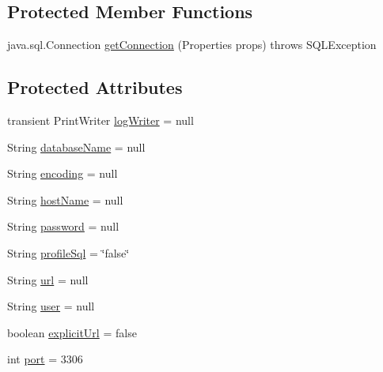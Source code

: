 \subsection*{Protected Member Functions}
\begin{DoxyCompactItemize}
\item 
java.\+sql.\+Connection \mbox{\hyperlink{classcom_1_1mysql_1_1jdbc_1_1jdbc2_1_1optional_1_1_mysql_data_source_ad532c3e1663ec177fe6863bd0c8ca47d}{get\+Connection}} (Properties props)  throws S\+Q\+L\+Exception 
\end{DoxyCompactItemize}
\subsection*{Protected Attributes}
\begin{DoxyCompactItemize}
\item 
transient Print\+Writer \mbox{\hyperlink{classcom_1_1mysql_1_1jdbc_1_1jdbc2_1_1optional_1_1_mysql_data_source_a3395cf528472ec6bca3215ec6cf2f22e}{log\+Writer}} = null
\item 
String \mbox{\hyperlink{classcom_1_1mysql_1_1jdbc_1_1jdbc2_1_1optional_1_1_mysql_data_source_a9a4fed49fe5c75451a4e8a27556c703e}{database\+Name}} = null
\item 
String \mbox{\hyperlink{classcom_1_1mysql_1_1jdbc_1_1jdbc2_1_1optional_1_1_mysql_data_source_aa2b99a9bf60588635622eaa4662203c3}{encoding}} = null
\item 
String \mbox{\hyperlink{classcom_1_1mysql_1_1jdbc_1_1jdbc2_1_1optional_1_1_mysql_data_source_a10b314c7da59aa29686f56db5c720f7c}{host\+Name}} = null
\item 
String \mbox{\hyperlink{classcom_1_1mysql_1_1jdbc_1_1jdbc2_1_1optional_1_1_mysql_data_source_a724ca2e1339665ad95c4044ea387ce2e}{password}} = null
\item 
String \mbox{\hyperlink{classcom_1_1mysql_1_1jdbc_1_1jdbc2_1_1optional_1_1_mysql_data_source_ab8e54fa8599ab0053066000a93b20ac9}{profile\+Sql}} = \char`\"{}false\char`\"{}
\item 
String \mbox{\hyperlink{classcom_1_1mysql_1_1jdbc_1_1jdbc2_1_1optional_1_1_mysql_data_source_a20e8de35ee782ec00f41191aa7ed2101}{url}} = null
\item 
String \mbox{\hyperlink{classcom_1_1mysql_1_1jdbc_1_1jdbc2_1_1optional_1_1_mysql_data_source_a35e7845b72de08783e67cff5d7d67412}{user}} = null
\item 
boolean \mbox{\hyperlink{classcom_1_1mysql_1_1jdbc_1_1jdbc2_1_1optional_1_1_mysql_data_source_a11700c4a63df872705827caea6f27ad4}{explicit\+Url}} = false
\item 
int \mbox{\hyperlink{classcom_1_1mysql_1_1jdbc_1_1jdbc2_1_1optional_1_1_mysql_data_source_a7ca619ab0d9d25a0146965a5fb55391c}{port}} = 3306
\end{DoxyCompactItemize}
